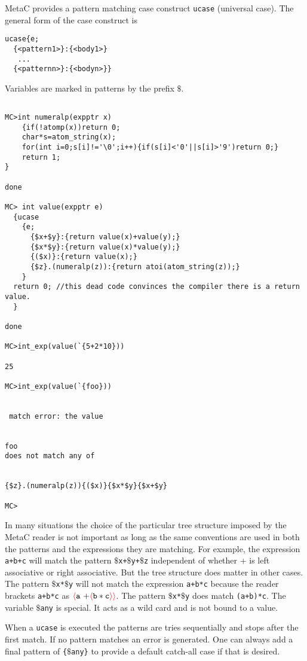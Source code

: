 \documentclass{article}
\newcommand{\fopen}{{\color{red} \langle}}
\newcommand{\fclose}{{\color{red} \rangle}}
\begin{document}
MetaC provides a pattern matching case construct {\tt ucase} (universal case).
The general form of the case construct is

\begin{verbatim}
ucase{e;
  {<pattern1>}:{<body1>}
   ...
  {<patternn>}:{<bodyn>}}
\end{verbatim}

Variables are marked in patterns by the prefix $\$$.

\begin{verbatim}

MC>int numeralp(expptr x)
    {if(!atomp(x))return 0;
    char*s=atom_string(x);
    for(int i=0;s[i]!='\0';i++){if(s[i]<'0'||s[i]>'9')return 0;}
    return 1;
}

done

MC> int value(expptr e)
  {ucase
    {e;
      {$x+$y}:{return value(x)+value(y);}
      {$x*$y}:{return value(x)*value(y);}
      {($x)}:{return value(x);}
      {$z}.(numeralp(z)):{return atoi(atom_string(z));}
    }
  return 0; //this dead code convinces the compiler there is a return value.
  }

done

MC>int_exp(value(`{5+2*10}))

25

MC>int_exp(value(`{foo}))


 match error: the value 


foo
does not match any of


{$z}.(numeralp(z)){($x)}{$x*$y}{$x+$y}

MC>
\end{verbatim}

In many situations the choice of the particular tree structure imposed by the MetaC reader is not important as long as the same conventions are used in both the patterns and the expressions
they are matching.  For example, the expression {\tt a+b+c} will match the pattern
{\tt $\$$x+$\$$y+$\$$z} independent of whether + is left associative or right associative.  But the tree structure does matter in other cases.  The pattern {\tt $\$$x*$\$$y}
will not match the expression {\tt a+b*c} because the reader brackets {\tt a+b*c} as  $\fopen \mathtt{a~+} \fopen \mathtt{b * c} \fclose\fclose$. The pattern {\tt $\$$x*$\$$y} does match {\tt (a+b)*c}.
The variable {\tt $\$$any} is special.  It acts as a wild card and is not bound to a value.

When a {\tt ucase} is executed the patterns are tries sequentially and stops after the first match.  If no pattern matches an error is generated.
One can always add a final pattern of {\tt \{$\$$any\}} to provide a default
catch-all case if that is desired.
\end{document}

